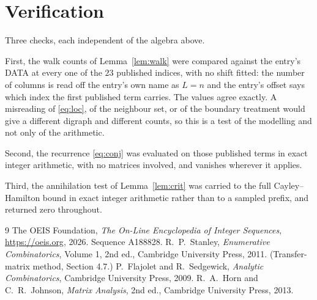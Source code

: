 \documentclass[11pt,a4paper]{article}
\theoremstyle{plain}
\theoremstyle{definition}
\begin{document}
\section{Verification}

Three checks, each independent of the algebra above.

First, the walk counts of Lemma~\ref{lem:walk} were compared against the entry's DATA at
every one of the $23$ published indices, with no shift fitted: the number of columns is
read off the entry's own name as $L=n$ and the entry's offset says which index the first
published term carries. The values agree exactly. A misreading of \eqref{eq:loc}, of the
neighbour set, or of the boundary treatment would give a different digraph and different
counts, so this is a test of the modelling and not only of the arithmetic.

Second, the recurrence \eqref{eq:conj} was evaluated on those published terms in exact
integer arithmetic, with no matrices involved, and vanishes wherever it applies.

Third, the annihilation test of Lemma~\ref{lem:crit} was carried to the full
Cayley--Hamilton bound in exact integer arithmetic rather than to a sampled prefix, and
returned zero throughout.

\begin{thebibliography}{9}
 The OEIS Foundation, \emph{The On-Line Encyclopedia of Integer
Sequences}, \url{https://oeis.org}, 2026. Sequence A188828.
 R.~P.~Stanley, \emph{Enumerative Combinatorics}, Volume 1, 2nd ed.,
Cambridge University Press, 2011. (Transfer-matrix method, Section 4.7.)
 P.~Flajolet and R.~Sedgewick, \emph{Analytic Combinatorics}, Cambridge
University Press, 2009.
 R.~A.~Horn and C.~R.~Johnson, \emph{Matrix Analysis}, 2nd ed., Cambridge
University Press, 2013.
\end{thebibliography}
\end{document}
